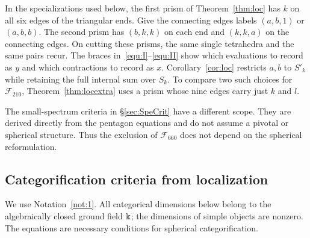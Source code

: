 \documentclass{amsart}
\begin{document}
In the specializations used below, the first prism of Theorem~\ref{thm:loc} has $k$ on all six edges of the triangular ends. Give the connecting edges labels $(a,b,1)$ or $(a,b,b)$. The second prism has $(b,k,k)$ on each end and $(k,k,a)$ on the connecting edges. On cutting these prisms, the same single tetrahedra and the same pairs recur. The braces in~\eqref{equ:I}--\eqref{equ:II} show which evaluations to record as $y$ and which contractions to record as $x$. Corollary~\ref{cor:loc} restricts $a,b$ to $S'_k$ while retaining the full internal sum over $S_k$. To compare two such choices for $\mathcal F_{210}$, Theorem~\ref{thm:locextra} uses a prism whose nine edges carry just $k$ and $l$.

The small-spectrum criteria in \S\ref{sec:SpeCrit} have a different scope. They are derived directly from the pentagon equations and do not assume a pivotal or spherical structure. Thus the exclusion of $\mathcal F_{660}$ does not depend on the spherical reformulation.

\subsection{Categorification criteria from localization} \label{sec:FirstLoc}

We use Notation~\ref{not:1}. All categorical dimensions below belong to the algebraically closed ground field $\Bbbk$; the dimensions of simple objects are nonzero. The equations are necessary conditions for spherical categorification.
\end{document}
